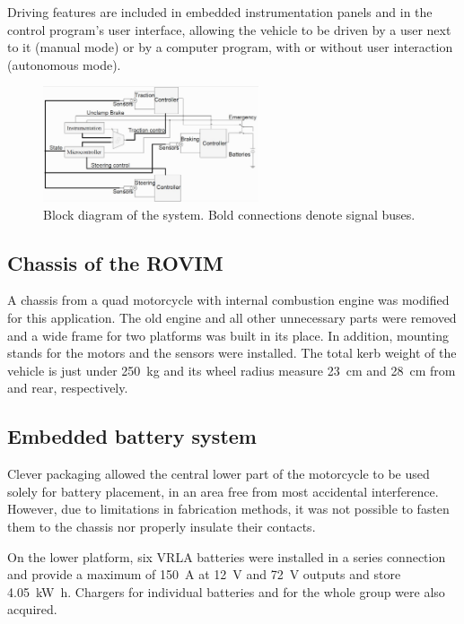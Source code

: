 \documentclass[journal]{IEEEtran}
\begin{document}
Driving features are included in embedded instrumentation panels and in the control program's user interface, allowing the vehicle to be driven by a user next to it (manual mode) or by a computer program, with or without user interaction (autonomous mode).

\begin{figure}[!t]
    \centering
\includegraphics[width=2.5in]{recursos/imagens/block_diagram.jpg}
\caption{Block diagram of the system. Bold connections denote signal buses.}
\label{fig:block_diagram}
\end{figure}

\subsection{Chassis of the ROVIM}

A chassis from a quad motorcycle with internal combustion engine was modified for this application. The old engine and all other unnecessary parts were removed and a wide frame for two platforms was built in its place. In addition, mounting stands for the motors and the sensors were installed. The total kerb weight of the vehicle is just under \SI{250}{\kilo\gram} and its wheel radius measure \SI{23}{\centi\meter} and \SI{28}{\centi\meter} from and rear, respectively.

\subsection{Embedded battery system}

Clever packaging allowed the central lower part of the motorcycle to be used solely for battery placement, in an area free from most accidental interference. However, due to limitations in fabrication methods, it was not possible to fasten them to the chassis nor properly insulate their contacts.

On the lower platform, six \ac{VRLA} batteries were installed in a series connection and provide a maximum of \SI{150}{\ampere} at \SI{12}{\volt} and \SI{72}{\volt} outputs and store \SI{4.05}{\kilo\watt\hour}. Chargers for individual batteries and for the whole group were also acquired.
\end{document}
